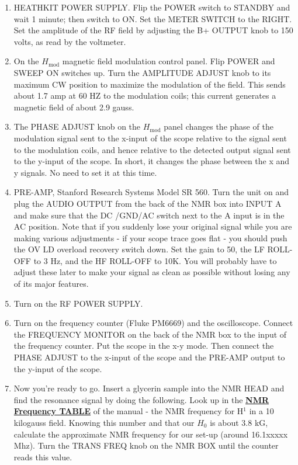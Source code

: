 \documentclass{../lab}
\begin{document}
\begin{enumerate}
    \item HEATHKIT POWER SUPPLY. Flip the POWER switch to STANDBY and wait 1 minute; then switch to ON. Set the METER SWITCH to the RIGHT. Set the amplitude of the RF field by adjusting the B+ OUTPUT knob to 150 volts, as read by the voltmeter.

    \item On the $H_\text{mod}$ magnetic field modulation control panel. Flip POWER and SWEEP ON switches up. Turn the AMPLITUDE ADJUST knob to its maximum CW position to maximize the modulation of the field. This sends about 1.7 amp at 60 HZ to the modulation coils; this current generates a magnetic field of about 2.9 gauss.

    \item The PHASE ADJUST knob on the $H_\text{mod}$ panel changes the phase of the modulation signal sent to the x-input of the scope relative to the signal sent to the modulation coils, and hence relative to the detected output signal sent to the y-input of the scope. In short, it changes the phase between the x and y signals. No need to set it at this time.

    \item PRE-AMP, Stanford Research Systems Model SR 560. Turn the unit on and plug the AUDIO OUTPUT from the back of the NMR box into INPUT A and make sure that the DC /GND/AC switch next to the A input is in the AC position. Note that if you suddenly lose your original signal while you are making various adjustments - if your scope trace goes flat - you should push the OV LD overload recovery switch down. Set the gain to 50, the LF ROLL-OFF to 3 Hz, and the HF ROLL-OFF to 10K. You will probably have to adjust these later to make your signal as clean as possible without losing any of its major features.

    \item Turn on the RF POWER SUPPLY.

    \item Turn on the frequency counter (Fluke PM6669) and the oscilloscope. Connect the FREQUENCY MONITOR on the back of the NMR box to the input of the frequency counter. Put the scope in the x-y mode. Then connect the PHASE ADJUST to the x-input of the scope and the PRE-AMP output to the y-input of the scope.

    \item Now you're ready to go. Insert a glycerin sample into the NMR HEAD and find the resonance signal by doing the following. Look up in the \href{http://experimentationlab.berkeley.edu/sites/default/files/images/NMR32.jpg}{\textbf{NMR Frequency TABLE}} of the manual - the NMR frequency for H$^1$ in a 10 kilogauss field. Knowing this number and that our $H_0$ is about 3.8 kG, calculate the approximate NMR frequency for our set-up (around 16.1xxxxx Mhz). Turn the TRANS FREQ knob on the NMR BOX until the counter reads this value.
    

\end{enumerate}
\end{document}
